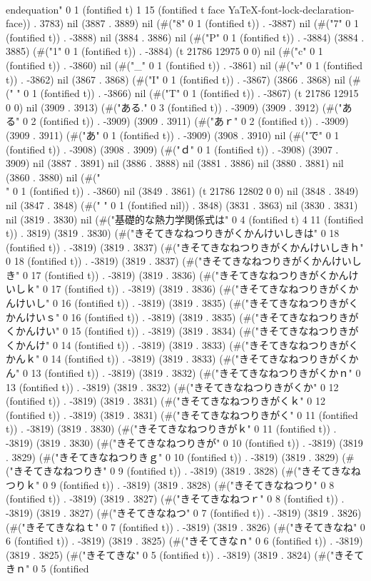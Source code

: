 \\end{equation}" 0 1 (fontified t) 1 15 (fontified t face YaTeX-font-lock-declaration-face)) . 3783) nil (3887 . 3889) nil (#("8" 0 1 (fontified t)) . -3887) nil (#("7" 0 1 (fontified t)) . -3888) nil (3884 . 3886) nil (#("P" 0 1 (fontified t)) . -3884) (3884 . 3885) (#("1" 0 1 (fontified t)) . -3884) (t 21786 12975 0 0) nil (#("c" 0 1 (fontified t)) . -3860) nil (#("_" 0 1 (fontified t)) . -3861) nil (#("v" 0 1 (fontified t)) . -3862) nil (3867 . 3868) (#("I" 0 1 (fontified t)) . -3867) (3866 . 3868) nil (#(" " 0 1 (fontified t)) . -3866) nil (#("T" 0 1 (fontified t)) . -3867) (t 21786 12915 0 0) nil (3909 . 3913) (#("ある." 0 3 (fontified t)) . -3909) (3909 . 3912) (#("ある" 0 2 (fontified t)) . -3909) (3909 . 3911) (#("あｒ" 0 2 (fontified t)) . -3909) (3909 . 3911) (#("あ" 0 1 (fontified t)) . -3909) (3908 . 3910) nil (#("で" 0 1 (fontified t)) . -3908) (3908 . 3909) (#("ｄ" 0 1 (fontified t)) . -3908) (3907 . 3909) nil (3887 . 3891) nil (3886 . 3888) nil (3881 . 3886) nil (3880 . 3881) nil (3860 . 3880) nil (#("\\" 0 1 (fontified t)) . -3860) nil (3849 . 3861) (t 21786 12802 0 0) nil (3848 . 3849) nil (3847 . 3848) (#(" " 0 1 (fontified nil)) . 3848) (3831 . 3863) nil (3830 . 3831) nil (3819 . 3830) nil (#("基礎的な熱力学関係式は" 0 4 (fontified t) 4 11 (fontified t)) . 3819) (3819 . 3830) (#("きそてきなねつりきがくかんけいしきは" 0 18 (fontified t)) . -3819) (3819 . 3837) (#("きそてきなねつりきがくかんけいしきｈ" 0 18 (fontified t)) . -3819) (3819 . 3837) (#("きそてきなねつりきがくかんけいしき" 0 17 (fontified t)) . -3819) (3819 . 3836) (#("きそてきなねつりきがくかんけいしｋ" 0 17 (fontified t)) . -3819) (3819 . 3836) (#("きそてきなねつりきがくかんけいし" 0 16 (fontified t)) . -3819) (3819 . 3835) (#("きそてきなねつりきがくかんけいｓ" 0 16 (fontified t)) . -3819) (3819 . 3835) (#("きそてきなねつりきがくかんけい" 0 15 (fontified t)) . -3819) (3819 . 3834) (#("きそてきなねつりきがくかんけ" 0 14 (fontified t)) . -3819) (3819 . 3833) (#("きそてきなねつりきがくかんｋ" 0 14 (fontified t)) . -3819) (3819 . 3833) (#("きそてきなねつりきがくかん" 0 13 (fontified t)) . -3819) (3819 . 3832) (#("きそてきなねつりきがくかｎ" 0 13 (fontified t)) . -3819) (3819 . 3832) (#("きそてきなねつりきがくか" 0 12 (fontified t)) . -3819) (3819 . 3831) (#("きそてきなねつりきがくｋ" 0 12 (fontified t)) . -3819) (3819 . 3831) (#("きそてきなねつりきがく" 0 11 (fontified t)) . -3819) (3819 . 3830) (#("きそてきなねつりきがｋ" 0 11 (fontified t)) . -3819) (3819 . 3830) (#("きそてきなねつりきが" 0 10 (fontified t)) . -3819) (3819 . 3829) (#("きそてきなねつりきｇ" 0 10 (fontified t)) . -3819) (3819 . 3829) (#("きそてきなねつりき" 0 9 (fontified t)) . -3819) (3819 . 3828) (#("きそてきなねつりｋ" 0 9 (fontified t)) . -3819) (3819 . 3828) (#("きそてきなねつり" 0 8 (fontified t)) . -3819) (3819 . 3827) (#("きそてきなねつｒ" 0 8 (fontified t)) . -3819) (3819 . 3827) (#("きそてきなねつ" 0 7 (fontified t)) . -3819) (3819 . 3826) (#("きそてきなねｔ" 0 7 (fontified t)) . -3819) (3819 . 3826) (#("きそてきなね" 0 6 (fontified t)) . -3819) (3819 . 3825) (#("きそてきなｎ" 0 6 (fontified t)) . -3819) (3819 . 3825) (#("きそてきな" 0 5 (fontified t)) . -3819) (3819 . 3824) (#("きそてきｎ" 0 5 (fontified 